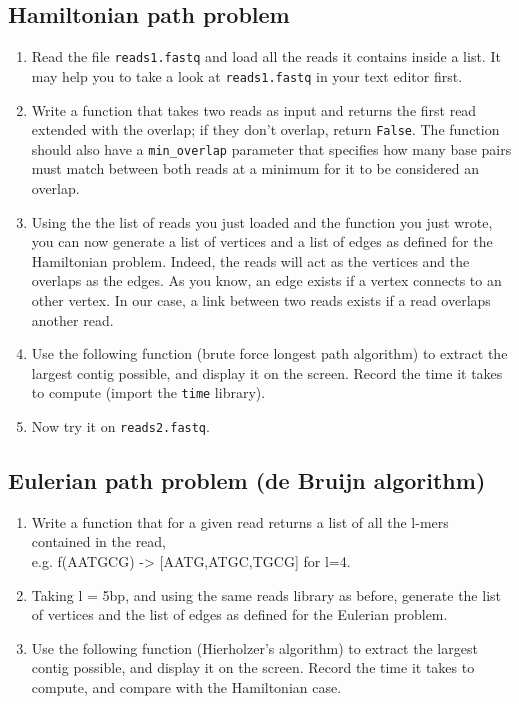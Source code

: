 \documentclass[a4paper,11pt]{article}
\begin{document}
\subsection{Hamiltonian path problem}
\begin{enumerate}
\item Read the file \texttt{reads1.fastq} and load all the reads it contains inside a list. It may help you to take a look at \texttt{reads1.fastq} in your text editor first.
\item Write a function that takes two reads as input and returns the first read extended with the overlap; if they don't overlap, return \texttt{False}. The function should also have a \texttt{min\_overlap} parameter that specifies how many base pairs must match between both reads at a minimum for it to be considered an overlap.
\item Using the the list of reads you just loaded and the function you just wrote, you can now generate a list of vertices and a list of edges as defined for the Hamiltonian problem. Indeed, the reads will act as the vertices and the overlaps as the edges. As you know, an edge exists if a vertex connects to an other vertex. In our case, a link between two reads exists if a read overlaps another read.
\item Use the following function (brute force longest path algorithm) to extract the largest contig possible, and display it on the screen. Record the time it takes to compute (import the \texttt{time} library).
\item Now try it on \texttt{reads2.fastq}.

\end{enumerate}

\subsection{Eulerian path problem (de Bruijn algorithm)}
\begin{enumerate}
\item Write a function that for a given read returns a list of all the l-mers contained in the read, \\
e.g. f(AATGCG) ->  [AATG,ATGC,TGCG] for l=4.
\item Taking l = 5bp, and using the same reads library as before, generate the list of vertices and the list of edges as defined for the Eulerian problem.
\item Use the following function (Hierholzer's algorithm) to extract the largest contig possible, and display it on the screen. Record the time it takes to compute, and compare with the Hamiltonian case.
\end{enumerate}
\end{document}
